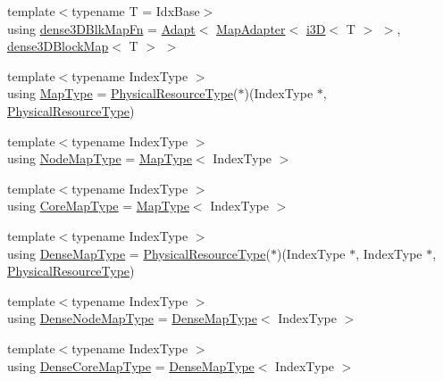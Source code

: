 \begin{DoxyCompactItemize}
\item 
{\footnotesize template$<$typename T  = Idx\+Base$>$ }\\using \hyperlink{namespacevt_1_1mapping_af947e4c94da260154c26fdca517f1a79}{dense3\+D\+Blk\+Map\+Fn} = \hyperlink{namespacevt_1_1mapping_ab3efa0ad45a85d80210d4acef3bb6c22}{Adapt}$<$ \hyperlink{namespacevt_1_1mapping_a41b113c28bb6430fbcb5be66e08ccf9f}{Map\+Adapter}$<$ \hyperlink{namespacevt_1_1mapping_af435b967b9ed1ccb5ec4effdbd9abd13}{i3D}$<$ T $>$ $>$, \hyperlink{namespacevt_1_1mapping_a91764d84e5e6d8253872740cb8424726}{dense3\+D\+Block\+Map}$<$ T $>$ $>$
\item 
{\footnotesize template$<$typename Index\+Type $>$ }\\using \hyperlink{namespacevt_1_1mapping_a443f8bb8920af5ae1d3391f61fe492a6}{Map\+Type} = \hyperlink{namespacevt_a2dc36fcada816dc6d11774d650328ee9}{Physical\+Resource\+Type}($\ast$)(Index\+Type $\ast$, \hyperlink{namespacevt_a2dc36fcada816dc6d11774d650328ee9}{Physical\+Resource\+Type})
\item 
{\footnotesize template$<$typename Index\+Type $>$ }\\using \hyperlink{namespacevt_1_1mapping_a8dbe779cb3e28ed8c424bcc8826765b9}{Node\+Map\+Type} = \hyperlink{namespacevt_1_1mapping_a443f8bb8920af5ae1d3391f61fe492a6}{Map\+Type}$<$ Index\+Type $>$
\item 
{\footnotesize template$<$typename Index\+Type $>$ }\\using \hyperlink{namespacevt_1_1mapping_abff207bec72f006a2e66ff14fc51255a}{Core\+Map\+Type} = \hyperlink{namespacevt_1_1mapping_a443f8bb8920af5ae1d3391f61fe492a6}{Map\+Type}$<$ Index\+Type $>$
\item 
{\footnotesize template$<$typename Index\+Type $>$ }\\using \hyperlink{namespacevt_1_1mapping_a64f0fc107b569bb6644f1b015c6e7ad8}{Dense\+Map\+Type} = \hyperlink{namespacevt_a2dc36fcada816dc6d11774d650328ee9}{Physical\+Resource\+Type}($\ast$)(Index\+Type $\ast$, Index\+Type $\ast$, \hyperlink{namespacevt_a2dc36fcada816dc6d11774d650328ee9}{Physical\+Resource\+Type})
\item 
{\footnotesize template$<$typename Index\+Type $>$ }\\using \hyperlink{namespacevt_1_1mapping_a224f382367a2c65c3be2a9f91f89ffd5}{Dense\+Node\+Map\+Type} = \hyperlink{namespacevt_1_1mapping_a64f0fc107b569bb6644f1b015c6e7ad8}{Dense\+Map\+Type}$<$ Index\+Type $>$
\item 
{\footnotesize template$<$typename Index\+Type $>$ }\\using \hyperlink{namespacevt_1_1mapping_ac198c707792d29c7e3106fb89c3f3f92}{Dense\+Core\+Map\+Type} = \hyperlink{namespacevt_1_1mapping_a64f0fc107b569bb6644f1b015c6e7ad8}{Dense\+Map\+Type}$<$ Index\+Type $>$

\end{DoxyCompactItemize}
